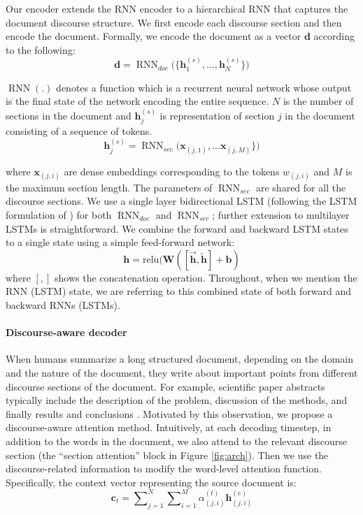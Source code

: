 \documentclass[11pt,a4paper]{article}
\newcommand{\V}[1][\mathbf]{#1}
\newcommand{\encstate}[1]{\mathbf{h}_{#1}^{(e)}}
\newcommand{\encstatesec}[1]{\mathbf{h}_{#1}^{(s)}}
\DeclareMathOperator{\RNN}{RNN}
\begin{document}
Our encoder extends the RNN encoder to a hierarchical RNN that captures the document discourse structure. We first encode each discourse section and then encode the document. Formally, we encode the document as a vector $\V{d}$ according to the following:
$$\V{d}=\RNN_{doc} \big( \{\encstatesec{1}, ..., \encstatesec{N}\} \big)$$

\noindent $\RNN(.)$ denotes a function which is a recurrent neural network whose output is the final state of the network encoding the entire sequence. $N$ is the number of sections in the document and $\encstatesec{j}$ is representation of section $j$ in the document consisting of a sequence of tokens.
$$\encstatesec{j} = \RNN_{sec} \big( \V{x}_{(j,1)}, ... \V{x}_{(j,M)}\}\big)$$

\noindent where $\V{x}_{(j,i)}$ are dense embeddings corresponding to the tokens $w_{(j,i)}$ and $M$ is the maximum section length. The parameters of $\RNN_{sec}$ are shared for all the discourse sections. We use a single layer bidirectional LSTM (following the LSTM formulation of ) for both $\RNN_{doc}$ and $\RNN_{sec}$; further extension to multilayer LSTMs is straightforward. We combine the forward and backward LSTM states to a single state using a simple feed-forward network:
$$\V{h}=\mathrm{relu}(\V{W}([\overrightarrow{\V{h}},\overleftarrow{\V{h}}]+\V{b})$$
where $[,]$ shows the concatenation operation.
Throughout, when we mention the RNN (LSTM) state, we are referring to this combined state of both forward and backward RNNs (LSTMs).

\paragraph{Discourse-aware decoder}

When humans summarize a long structured document, depending on the domain and the nature of the document, they write about important points from different discourse sections of the document. For example, scientific paper abstracts typically include the description of the problem, discussion of the methods, and finally results and conclusions \cite{Suppe1998-SUPTSO}. Motivated by this observation, we propose a discourse-aware attention method.
Intuitively, at each decoding timestep, in addition to the words in the document, we also attend to the relevant discourse section (the ``section attention'' block in Figure \ref{fig:arch}). Then we use the discourse-related information to modify the word-level attention function. Specifically, the context vector representing the source document is:
\begin{equation}
\V{c}_t = \sum\nolimits_{j=1}^N \sum\nolimits_{i=1}^M \alpha_{(j,i)}^{(t)} \encstate{(j,i)}
\label{eq:context} \end{equation}
\end{document}
